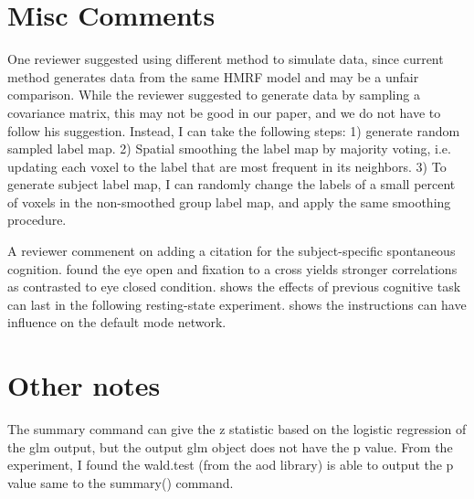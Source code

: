\documentclass[12pt]{article}
\begin{document}
\section{Misc Comments}
One reviewer suggested using different method to simulate data, since current
method generates data from the same HMRF model and may be a unfair
comparison. While the reviewer suggested to generate data by sampling a
covariance matrix, this may not be good in our paper, and we do not have to
follow his suggestion. Instead, I can take the following steps: 1) generate
random sampled label map. 2) Spatial smoothing the label map by majority voting,
i.e. updating each voxel to the label that are most frequent in its
neighbors. 3) To generate subject label map, I can randomly change the labels of
a small percent of voxels in the non-smoothed group label map, and apply the
same smoothing procedure.

A reviewer commenent on adding a citation for the subject-specific spontaneous
cognition. \citet{van2010intrinsic} found the eye open and fixation to a cross
yields stronger correlations as contrasted to eye closed
condition. \cite{waites2005effect} shows the effects of previous cognitive task
can last in the following resting-state experiment. \cite{benjamin2010influence}
shows the instructions can have influence on the default mode network.

\section{Other notes}
The summary command can give the z statistic based on the logistic regression of
the glm output, but the output glm object does not have the p value. From the
experiment, I found the wald.test (from the aod library) is able to output the p
value same to the summary() command.





\end{document}
